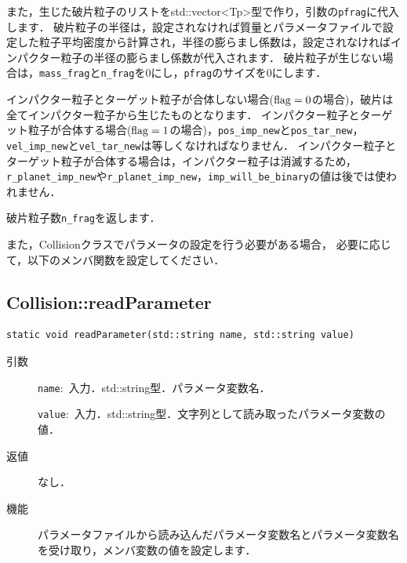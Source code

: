 \documentclass[12pt,a4paper,dvipdfmx]{jsarticle}
\begin{document}
\begin{description}
\begin{itemize}
\end{itemize}

また，生じた破片粒子のリストをstd::vector<Tp>型で作り，引数の\texttt{pfrag}に代入します．
破片粒子の半径は，設定されなければ質量とパラメータファイルで設定した粒子平均密度から計算され，半径の膨らまし係数は，設定されなければインパクター粒子の半径の膨らまし係数が代入されます．
破片粒子が生じない場合は，\texttt{mass\_frag}と\texttt{n\_frag}を0にし，\texttt{pfrag}のサイズを0にします．

インパクター粒子とターゲット粒子が合体しない場合(${\rm flag}=0$の場合)，破片は全てインパクター粒子から生じたものとなります．
インパクター粒子とターゲット粒子が合体する場合(${\rm flag}=1$の場合)，\texttt{pos\_imp\_new}と\texttt{pos\_tar\_new}，\texttt{vel\_imp\_new}と\texttt{vel\_tar\_new}は等しくなければなりません．
インパクター粒子とターゲット粒子が合体する場合は，インパクター粒子は消滅するため，\texttt{r\_planet\_imp\_new}や\texttt{r\_planet\_imp\_new}，\texttt{imp\_will\_be\_binary}の値は後では使われません．

破片粒子数\texttt{n\_frag}を返します．
\end{description}


また，Collisionクラスでパラメータの設定を行う必要がある場合，
必要に応じて，以下のメンバ関数を設定してください．
\subsection{Collision::readParameter}

\begin{screen}
\begin{verbatim}
static void readParameter(std::string name, std::string value)
\end{verbatim}
\end{screen}

\begin{description}
\item[引数]

\texttt{name}:\ 入力．std::string型．パラメータ変数名．

\texttt{value}:\ 入力．std::string型．文字列として読み取ったパラメータ変数の値．

\item[返値]

なし．
\item[機能]

パラメータファイルから読み込んだパラメータ変数名とパラメータ変数名を受け取り，メンバ変数の値を設定します．
\end{description}
\end{document}
